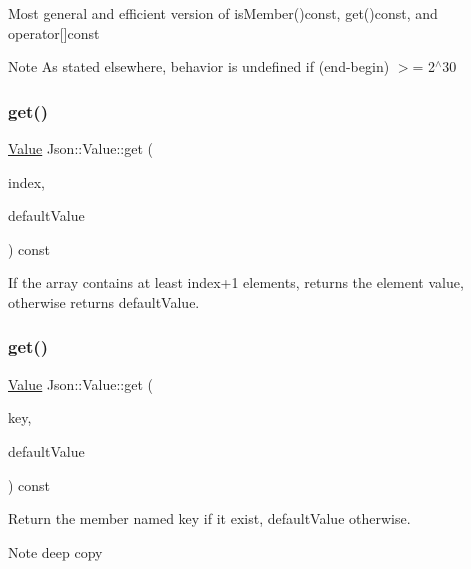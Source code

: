 Most general and efficient version of is\+Member()const, get()const, and operator\mbox{[}\mbox{]}const \begin{DoxyNote}{Note}
As stated elsewhere, behavior is undefined if (end-\/begin) $>$= 2$^\wedge$30 
\end{DoxyNote}
\mbox{\label{class_json_1_1_value_a034eb7bf85a44fa759bdaa232788ca66}} 
\subsubsection{\texorpdfstring{get()}{get()}\hspace{0.1cm}{\footnotesize\ttfamily [1/4]}}
{\footnotesize\ttfamily \hyperlink{class_json_1_1_value}{Value} Json\+::\+Value\+::get (\begin{DoxyParamCaption}\item[{Array\+Index}]{index,  }\item[{const \hyperlink{class_json_1_1_value}{Value} \&}]{default\+Value }\end{DoxyParamCaption}) const}

If the array contains at least index+1 elements, returns the element value, otherwise returns default\+Value. \mbox{\label{class_json_1_1_value_a57de86629ed23246f14014fb6c44fa67}} 
\subsubsection{\texorpdfstring{get()}{get()}\hspace{0.1cm}{\footnotesize\ttfamily [2/4]}}
{\footnotesize\ttfamily \hyperlink{class_json_1_1_value}{Value} Json\+::\+Value\+::get (\begin{DoxyParamCaption}\item[{const char $\ast$}]{key,  }\item[{const \hyperlink{class_json_1_1_value}{Value} \&}]{default\+Value }\end{DoxyParamCaption}) const}

Return the member named key if it exist, default\+Value otherwise. \begin{DoxyNote}{Note}
deep copy 
\end{DoxyNote}
\mbox{\label{class_json_1_1_value_aa59ed050e87e1d58d93671a38687f36c}} 
